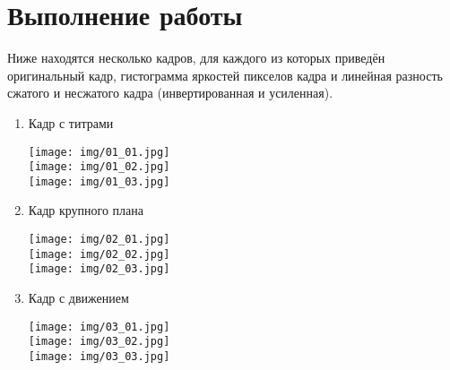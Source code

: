 \section{Выполнение работы}

Ниже находятся несколько кадров, для каждого из которых приведён оригинальный кадр, гистограмма яркостей пикселов кадра и линейная разность сжатого и несжатого кадра (инвертированная и усиленная).

\begin{enumerate}

\item Кадр с титрами

\texttt{[image: img/01\_01.jpg]}\\

\texttt{[image: img/01\_02.jpg]}\\

\texttt{[image: img/01\_03.jpg]}\\

\item Кадр крупного плана

\texttt{[image: img/02\_01.jpg]}\\

\texttt{[image: img/02\_02.jpg]}\\

\texttt{[image: img/02\_03.jpg]}\\

\item Кадр с движением

\texttt{[image: img/03\_01.jpg]}\\

\texttt{[image: img/03\_02.jpg]}\\

\texttt{[image: img/03\_03.jpg]}\\

\end{enumerate}

\pagebreak

